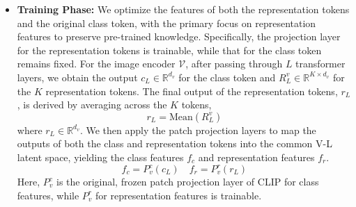 \begin{itemize} 

\item \textbf{Training Phase:} We optimize the features of both the representation tokens and the original class token, with the primary focus on representation features to preserve pre-trained knowledge. Specifically, the projection layer for the representation tokens is trainable, while that for the class token remains fixed. For the image encoder $\mathcal{V}$, after passing through $L$ transformer layers, we obtain the output $c_L \in \mathbb{R}^{d_v}$ for the class token and $R_L^v \in \mathbb{R}^{K \times d_v}$ for the $K$ representation tokens. The final output of the representation tokens, $r_L$, is derived by averaging across the $K$ tokens,
\begin{equation}
    r_L = \text{Mean}(R_L^v) \nonumber
\end{equation}
where $r_L \in \mathbb{R}^{d_v}$. We then apply the patch projection layers to map the outputs of both the class and representation tokens into the common V-L latent space, yielding the class features $f_c$ and representation features $f_r$.
\begin{equation}
    f_c = P_v^c(c_L) \quad f_r = P_v^r(r_L) \nonumber
\end{equation}
Here, $P_v^c$ is the original, frozen patch projection layer of CLIP for class features, while $P_v^r$ for representation features is trainable.


\end{itemize}
